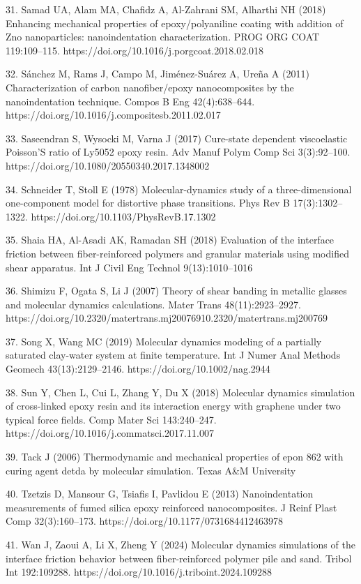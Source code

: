 \documentclass{article}
\begin{document}
\begin{hangpars}
31. Samad UA, Alam MA, Chafidz A, Al-Zahrani SM, Alharthi NH (2018) Enhancing mechanical properties of epoxy/polyaniline coating with addition of Zno nanoparticles: nanoindentation characterization. PROG ORG COAT 119:109–115. https://doi.org/10.1016/j.porgcoat.2018.02.018

32. Sánchez M, Rams J, Campo M, Jiménez-Suárez A, Ureña A (2011) Characterization of carbon nanofiber/epoxy nanocomposites by the nanoindentation technique. Compos B Eng 42(4):638–644. https://doi.org/10.1016/j.compositesb.2011.02.017

33. Saseendran S, Wysocki M, Varna J (2017) Cure-state dependent viscoelastic Poisson’S ratio of Ly5052 epoxy resin. Adv Manuf Polym Comp Sci 3(3):92–100. https://doi.org/10.1080/20550340.2017.1348002

34. Schneider T, Stoll E (1978) Molecular-dynamics study of a three-dimensional one-component model for distortive phase transitions. Phys Rev B 17(3):1302–1322. https://doi.org/10.1103/PhysRevB.17.1302

35. Shaia HA, Al-Asadi AK, Ramadan SH (2018) Evaluation of the interface friction between fiber-reinforced polymers and granular materials using modified shear apparatus. Int J Civil Eng Technol 9(13):1010–1016

36. Shimizu F, Ogata S, Li J (2007) Theory of shear banding in metallic glasses and molecular dynamics calculations. Mater Trans 48(11):2923–2927. https://doi.org/10.2320/matertrans.mj20076910.2320/matertrans.mj200769

37. Song X, Wang MC (2019) Molecular dynamics modeling of a partially saturated clay-water system at finite temperature. Int J Numer Anal Methods Geomech 43(13):2129–2146. https://doi.org/10.1002/nag.2944

38. Sun Y, Chen L, Cui L, Zhang Y, Du X (2018) Molecular dynamics simulation of cross-linked epoxy resin and its interaction energy with graphene under two typical force fields. Comp Mater Sci 143:240–247. https://doi.org/10.1016/j.commatsci.2017.11.007

39. Tack J (2006) Thermodynamic and mechanical properties of epon 862 with curing agent detda by molecular simulation. Texas A\&M University

40. Tzetzis D, Mansour G, Tsiafis I, Pavlidou E (2013) Nanoindentation measurements of fumed silica epoxy reinforced nanocomposites. J Reinf Plast Comp 32(3):160–173. https://doi.org/10.1177/0731684412463978

41. Wan J, Zaoui A, Li X, Zheng Y (2024) Molecular dynamics simulations of the interface friction behavior between fiber-reinforced polymer pile and sand. Tribol Int 192:109288. https://doi.org/10.1016/j.triboint.2024.109288


\end{hangpars}
\end{document}
